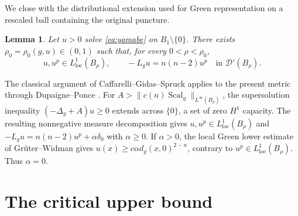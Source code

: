 \documentclass[11pt]{article}
\numberwithin{equation}{section}
\newtheorem{lemma}[theorem]{Lemma}
\theoremstyle{remark}
\begin{document}
{We close with the distributional extension used for Green
representation on a rescaled ball containing the original puncture.}
\begin{lemma}\label{lem:no-dirac}
Let \(u>0\) solve \eqref{eq:yamabe} on \(B_1\setminus\{0\}\).
There exists \(\rho_0=\rho_0(g,u)\in(0,1)\) such that, for every
\(0<\rho<\rho_0\),
{
\[
 u,u^p\in L^1_{\mathrm{loc}}(B_\rho),\qquad
 -L_gu=n(n-2)u^p\quad\text{in }\mathcal D'(B_\rho).
\]
}
\end{lemma}
The classical argument of Caffarelli--Gidas--Spruck
\cite[Lemma  2.1]{CGS} applies to the present metric through
Dupaigne--Ponce \cite[Theorem  4]{DupaignePonce}. For
\(A>\|c(n)\operatorname{Scal}_g\|_{L^\infty(B_\rho)}\), the supersolution inequality
\((-\Delta_g+A)u\ge0\) extends across \(\{0\}\), a set of zero
\(H^1\) capacity. The resulting nonnegative measure decomposition gives
\(u,u^p\in L^1_{\mathrm{loc}}(B_\rho)\) and
\(-L_gu=n(n-2)u^p+\alpha\delta_0\) with \(\alpha\ge0\).
If \(\alpha>0\), the local Green lower estimate of Gr\"uter--Widman
\cite{GruterWidman} gives
\(u(x)\ge c\alpha d_g(x,0)^{2-n}\), contrary to
\(u^p\in L^1_{\mathrm{loc}}(B_\rho)\). Thus \(\alpha=0\).

\section{The critical upper bound}
\label{sec:automatic-bound}
\label{sec:upper-green-identity}
\label{sec:upper-local-estimate}
\end{document}

